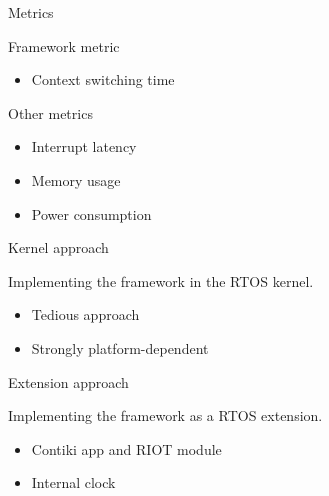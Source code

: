 \documentclass{beamer}
\begin{document}
\begin{frame}{Metrics}
\protect\hypertarget{metrics}{}

\begin{block}{Framework metric}

\begin{itemize}
\tightlist
\item
  Context switching time
\end{itemize}

\end{block}

\begin{block}{Other metrics}

\begin{itemize}
\tightlist
\item
  Interrupt latency
\item
  Memory usage
\item
  Power consumption
\end{itemize}

\end{block}

\end{frame}



\begin{frame}{Kernel approach}

Implementing the framework in the RTOS kernel.

\begin{itemize}
\tightlist
\item
  Tedious approach
\item
  Strongly platform-dependent
\end{itemize}

\end{frame}

\begin{frame}{Extension approach}

Implementing the framework as a RTOS extension.

\begin{itemize}
\tightlist
\item
  Contiki app and RIOT module
\item
  Internal clock
\end{itemize}

\end{frame}
\end{document}
